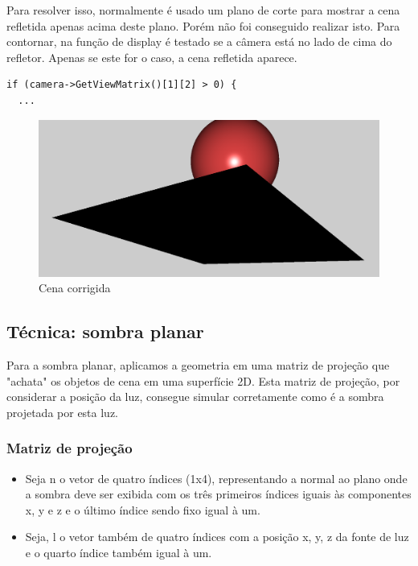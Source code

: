 \documentclass[11pt, a4paper]{article}
\begin{document}
Para resolver isso, normalmente é usado um plano de corte para mostrar a cena refletida apenas
acima deste plano. Porém não foi conseguido realizar isto. Para contornar, na função
de display é testado se a câmera está no lado de cima do
refletor.
Apenas se este for o caso, a cena refletida aparece.

\begin{verbatim}
if (camera->GetViewMatrix()[1][2] > 0) {
  ...
\end{verbatim}

\begin{figure}[H]
  \begin{center}
  \includegraphics[width=0.8\linewidth]{with-condition.png}
  \caption{Cena corrigida}
  \label{fig:vaz}
  \end{center}
\end{figure}


\subsection {Técnica: sombra planar}

Para a sombra planar, aplicamos a geometria em uma matriz de projeção que "achata"
os objetos de cena em uma superfície 2D. Esta matriz de projeção, por considerar a posição da luz,
consegue simular corretamente como é a sombra projetada por esta luz.

\subsubsection{Matriz de projeção}

\begin{itemize}
\item Seja n o vetor de quatro índices (1x4), representando a normal ao plano onde a sombra deve
ser exibida com os três primeiros índices iguais às componentes x, y e z e o último
índice sendo fixo igual à um.

\item Seja, l o vetor também de quatro índices com a posição x, y, z da fonte de luz 
e o quarto índice também igual à um.

\end{itemize}
\end{document}
